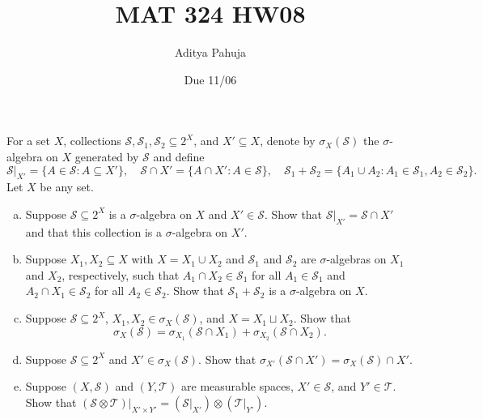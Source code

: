 \documentclass[10pt]{article}
\title{MAT 324 HW08}
\author{\large Aditya Pahuja}
\date{\large Due 11/06}
\providecommand{\ii}{\item}
\begin{document}
\maketitle

\begin{problem}
    For a set $X$, collections
    $\mathcal S, \mathcal S_1,\mathcal S_2\subseteq 2^X$,
    and $X'\subseteq X$, denote by $\sigma_X(\mathcal S)$
    the $\sigma$-algebra on $X$ generated by $\mathcal S$ and define
    \begin{equation*}
	\mathcal S|_{X'} = \{A\in\mathcal S : A\subseteq X'\},\quad
	\mathcal S\cap X' = \{A\cap X' : A\in\mathcal S\},\quad
	\mathcal S_1+\mathcal S_2 =
	\{A_1\cup A_2 : A_1\in\mathcal S_1,A_2\in\mathcal S_2\}.
    \end{equation*}
    Let $X$ be any set.
    \begin{enumerate}[(a)]
        \ii Suppose $\mathcal S\subseteq 2^X$ is a $\sigma$-algebra on $X$
	and $X'\in\mathcal S$. Show that $\mathcal S|_{X'} = \mathcal S\cap X'$
	and that this collection is a $\sigma$-algebra on $X'$.
	\ii Suppose $X_1,X_2\subseteq X$ with $X = X_1\cup X_2$
	and $\mathcal S_1$ and $\mathcal S_2$ are $\sigma$-algebras
	on $X_1$ and $X_2$, respectively, such that
	$A_1\cap X_2\in\mathcal S_1$ for all $A_1\in\mathcal S_1$
	and $A_2\cap X_1\in\mathcal S_2$ for all $A_2\in\mathcal S_2$.
	Show that $\mathcal S_1 + \mathcal S_2$ is a $\sigma$-algebra on $X$.
	\ii Suppose $\mathcal S\subseteq 2^X$, $X_1,X_2\in\sigma_X(\mathcal S)$,
	and $X = X_1\sqcup X_2$. Show that
	\begin{equation*}
	    \sigma_X(\mathcal S) = \sigma_{X_1}(\mathcal S\cap X_1)
	    + \sigma_{X_2}(\mathcal S\cap X_2).
	\end{equation*}
	\ii Suppose $\mathcal S\subseteq 2^X$ and $X'\in\sigma_X(\mathcal S)$.
	Show that $\sigma_{X'}(\mathcal S\cap X') = \sigma_X(\mathcal S)\cap X'$.
	\ii Suppose $(X,\mathcal S)$ and $(Y,\mathcal T)$ are measurable spaces,
	$X'\in\mathcal S$, and $Y'\in\mathcal T$.
	Show that $(\mathcal S\otimes\mathcal T)|_{X'\times Y'}
	= (\mathcal S|_{X'})\otimes(\mathcal T|_{Y'})$.
    \end{enumerate}
\end{problem}
\end{document}
